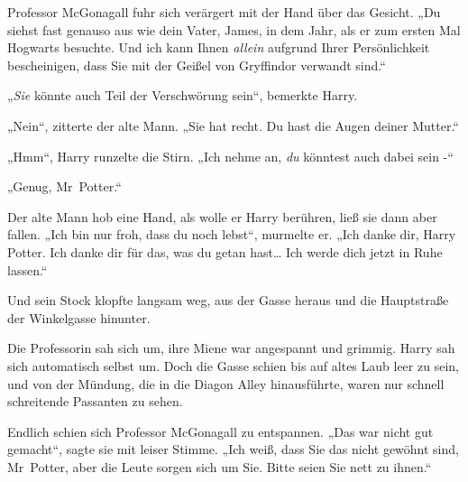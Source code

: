 Professor McGonagall fuhr sich verärgert mit der Hand über das Gesicht. „Du siehst fast genauso aus wie dein Vater, James, in dem Jahr, als er zum ersten Mal Hogwarts besuchte. Und ich kann Ihnen \emph{allein} aufgrund Ihrer Persönlichkeit bescheinigen, dass Sie mit der Geißel von Gryffindor verwandt sind.“

„\emph{Sie} könnte auch Teil der Verschwörung sein“, bemerkte Harry.

„Nein“, zitterte der alte Mann. „Sie hat recht. Du hast die Augen deiner Mutter.“

„Hmm“, Harry runzelte die Stirn. „Ich nehme an, \emph{du} könntest auch dabei sein -“

„Genug, Mr~Potter.“

Der alte Mann hob eine Hand, als wolle er Harry berühren, ließ sie dann aber fallen. „Ich bin nur froh, dass du noch lebst“, murmelte er. „Ich danke dir, Harry Potter. Ich danke dir für das, was du getan hast… Ich werde dich jetzt in Ruhe lassen.“

Und sein Stock klopfte langsam weg, aus der Gasse heraus und die Hauptstraße der Winkelgasse hinunter.

Die Professorin sah sich um, ihre Miene war angespannt und grimmig. Harry sah sich automatisch selbst um. Doch die Gasse schien bis auf altes Laub leer zu sein, und von der Mündung, die in die Diagon Alley hinausführte, waren nur schnell schreitende Passanten zu sehen.

Endlich schien sich Professor McGonagall zu entspannen. „Das war nicht gut gemacht“, sagte sie mit leiser Stimme. „Ich weiß, dass Sie das nicht gewöhnt sind, Mr~Potter, aber die Leute sorgen sich um Sie. Bitte seien Sie nett zu ihnen.“

